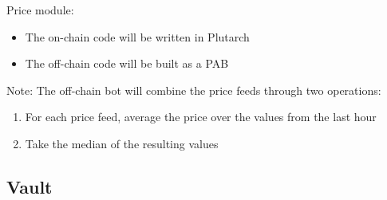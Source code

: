 \documentclass{article} %
\begin{document}
Price module:
\begin{itemize}
  \item The on-chain code will be written in Plutarch
  \item The off-chain code will be built as a PAB
\end{itemize}

Note: The off-chain bot will combine the price feeds through two operations:
\begin{enumerate}
  \item For each price feed, average the price over the values from the last
    hour
  \item Take the median of the resulting values
\end{enumerate}

% 
% 
% 
% 
% 
% 
\subsection{Vault}
\end{document}
